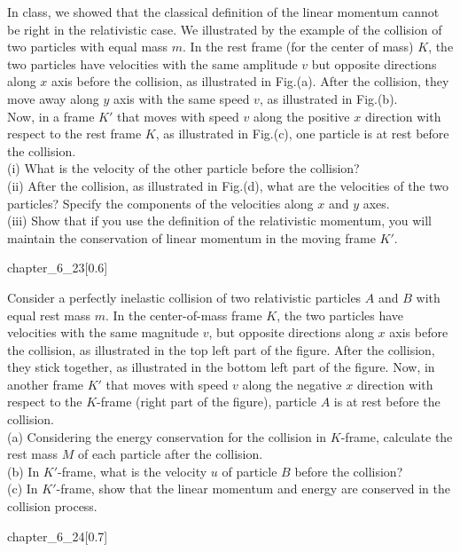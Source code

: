 \begin{example}
    In class, we showed that the classical definition of the linear
    momentum cannot be right in the relativistic case. We illustrated by the
    example of the collision of two particles with equal mass $m$. In the rest
    frame (for the center of mass) $K$, the two particles have velocities with
    the same amplitude $v$ but opposite directions along $x$ axis before the
    collision, as illustrated in Fig.(a). After the collision, they move away along $y$ axis with the same speed $v$, as illustrated in Fig.(b). \\Now, in a frame $K'$ that moves with speed $v$ along the positive $x$ direction with respect to the rest frame $K$, as illustrated in Fig.(c), one particle is at rest before the
    collision.
    \\(i) What is the velocity of the other particle before the
    collision?
    \\(ii) After the collision, as illustrated in Fig.(d), what are the velocities of
    the two particles? Specify the components of the velocities along $x$ and
    $y$ axes.
    \\(iii) Show that if you use the definition of the relativistic
    momentum, you will maintain the conservation of linear momentum in
    the moving frame $K'$.
    \begin{singlefigure}{chapter_6_23}[0.6]
    \end{singlefigure}
\end{example}
\begin{example}
    Consider a perfectly inelastic collision of two relativistic particles $A$ and $B$ with equal rest mass $m$. In the center-of-mass frame $K$, the two particles have velocities with the same magnitude $v$, but opposite directions along $x$ axis before the collision, as illustrated in the top left part of the figure. After the collision, they stick together, as illustrated in the bottom left part of the figure. Now, in another frame $K'$ that moves with speed $v$ along the negative $x$ direction with respect to the $K$-frame (right part of the figure), particle $A$ is at rest before the collision.
    \\(a) Considering the energy conservation for the collision in $K$-frame, calculate the
    rest mass $M$ of each particle after the collision.
    \\(b) In $K'$-frame, what is the velocity $u$ of particle $B$ before the collision?
    \\(c) In $K'$-frame, show that the linear momentum and energy are conserved in the collision process.
    \begin{singlefigure}{chapter_6_24}[0.7]
    \end{singlefigure}
\end{example}
